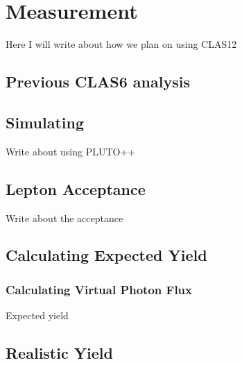 \section{Measurement}
Here I will write about how we plan on using CLAS12
\subsection{Previous CLAS6 analysis}
\subsection{Simulating}
Write about using PLUTO++
\subsection{Lepton Acceptance}
Write about the acceptance
\subsection{Calculating Expected Yield}
\subsubsection{Calculating Virtual Photon Flux}
Expected yield
\subsection{Realistic Yield}